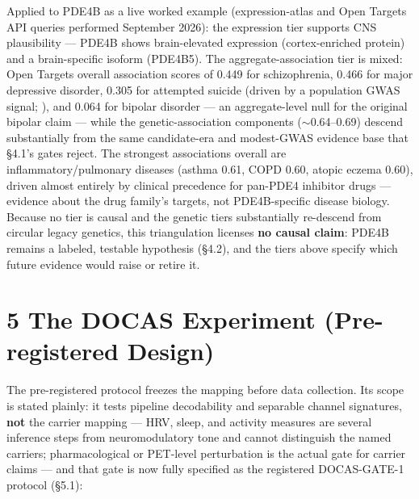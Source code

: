 \documentclass[
]{article}
\begin{document}
Applied to PDE4B as a live worked example (expression-atlas and Open
Targets API queries performed September 2026): the expression tier
supports CNS plausibility --- PDE4B shows brain-elevated expression
(cortex-enriched protein) and a brain-specific isoform (PDE4B5). The
aggregate-association tier is mixed: Open Targets overall association
scores of 0.449 for schizophrenia, 0.466 for major depressive disorder,
0.305 for attempted suicide (driven by a population GWAS signal; ), and
0.064 for bipolar disorder --- an aggregate-level null for the original
bipolar claim --- while the genetic-association components
(\(\sim\)0.64--0.69) descend substantially from the same candidate-era
and modest-GWAS evidence base that §4.1's gates reject. The strongest
associations overall are inflammatory/pulmonary diseases (asthma 0.61,
COPD 0.60, atopic eczema 0.60), driven almost entirely by clinical
precedence for pan-PDE4 inhibitor drugs --- evidence about the drug
family's targets, not PDE4B-specific disease biology. Because no tier is
causal and the genetic tiers substantially re-descend from circular
legacy genetics, this triangulation licenses \textbf{no causal claim}:
PDE4B remains a labeled, testable hypothesis (§4.2), and the tiers above
specify which future evidence would raise or retire it.

\section{5 The DOCAS Experiment (Pre-registered
Design)}\label{the-docas-experiment-pre-registered-design}

The pre-registered protocol freezes the mapping before data collection.
Its scope is stated plainly: it tests pipeline decodability and
separable channel signatures, \textbf{not} the carrier mapping --- HRV,
sleep, and activity measures are several inference steps from
neuromodulatory tone and cannot distinguish the named carriers;
pharmacological or PET-level perturbation is the actual gate for carrier
claims --- and that gate is now fully specified as the registered
DOCAS-GATE-1 protocol (§5.1):
\end{document}
